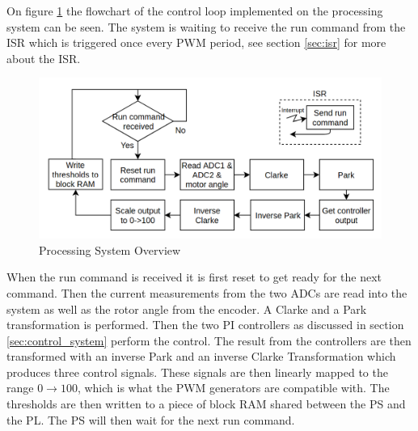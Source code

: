 On figure \ref{fig:software_flow} the flowchart of the control loop implemented on the processing system can be seen. The system is waiting to receive the run command from the ISR which is triggered once every PWM period, see section \ref{sec:isr} for more about the ISR. 


\begin{figure}[H]
	\centering
	\includegraphics[width=0.9\linewidth]{pictures/software/software_flow.png}
	\caption{Processing System Overview}
	\label{fig:software_flow}
\end{figure}

When the run command is received it is first reset to get ready for the next command. Then the current measurements from the two ADCs are read into the system as well as the rotor angle from the encoder. A Clarke and a Park transformation is performed. Then the two PI controllers as discussed in section \ref{sec:control_system} perform the control. The result from the controllers are then transformed with an inverse Park and an inverse Clarke Transformation which produces three control signals. These signals are then linearly mapped to the range $0 \rightarrow 100$, which is what the PWM generators are compatible with. 
The thresholds are then written to a piece of block RAM shared between the PS and the PL. The PS will then wait for the next run command.



